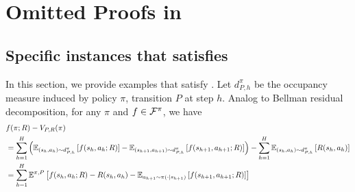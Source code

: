 \section{Omitted Proofs in }
\label{app:model-free full proof}


\subsection{Specific instances that satisfies }
In this section, we provide examples that satisfy . Let $d_{P,h}^\pi$ be the occupancy measure induced by policy $\pi$, transition $P$ at step $h$.
Analog to Bellman residual decomposition, for any $\pi$ and $f \in \mathcal{F}^{\pi}$, we have
\begin{align*}
    &f(\pi; R) - V_{P, R}(\pi) 
    \\&= \sum_{h=1}^H\left(\mathbb{E}_{(s_h,a_h) \sim d_{P, h}^\pi}\left[f(s_h, a_h; R)\right] - \mathbb{E}_{(s_{h+1},a_{h+1}) \sim d_{P, h}^\pi}\left[f(s_{h+1}, a_{h+1}; R)\right]\right) - \sum_{h=1}^H \mathbb{E}_{(s_h,a_h) \sim d_{P,h}^\pi}\left[R(s_h,a_h)\right]
    \\&= \sum_{h=1}^H \mathbb{E}^{\pi, P}\left[f(s_h, a_h; R) - R(s_h, a_h) - \mathbb{E}_{a_{h+1} \sim \pi(\cdot|s_{h+1})}\left[f(s_{h+1}, a_{h+1}; R)\right]\right]
\end{align*}
